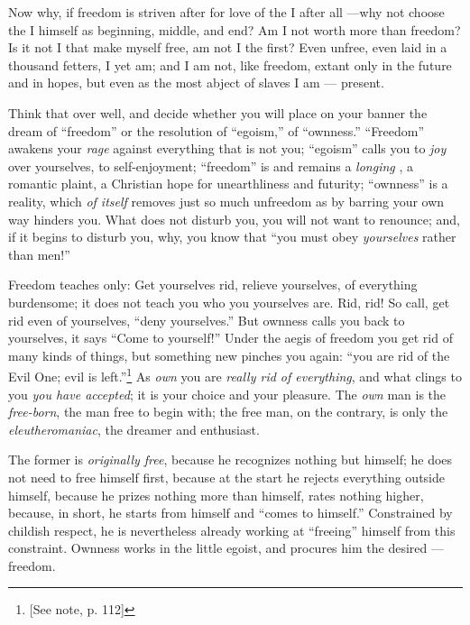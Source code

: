 Now why, if freedom is striven after for love of the I after all ---why not 
choose the I himself as beginning, middle, and end? Am I not worth more than 
freedom? Is it not I that make myself free, am not I the first? Even unfree, 
even laid in a thousand fetters, I yet am; and I am not, like freedom, extant 
only in the future and in hopes, but even as the most abject of slaves I am --- 
present.

Think that over well, and decide whether you will place on your banner the 
dream of ``freedom'' or the resolution of ``egoism,'' of ``ownness.'' 
``Freedom'' awakens your \textit{rage} against everything that is not you; 
``egoism'' calls you to \textit{joy} over yourselves, to self-enjoyment; 
``freedom'' is and remains a \textit{longing} , a romantic plaint, a 
Christian hope for unearthliness and futurity; ``ownness'' is a reality, 
which \textit{of itself} removes just so much unfreedom as by barring your own 
way hinders you. What does not disturb you, you will not want to renounce; 
and, if it begins to disturb you, why, you know that ``you must obey 
\textit{yourselves} rather than men!''

Freedom teaches only: Get yourselves rid, relieve yourselves, of everything 
burdensome; it does not teach you who you yourselves are. Rid, rid! So call, 
get rid even of yourselves, ``deny yourselves.'' But ownness calls you back 
to yourselves, it says ``Come to yourself!'' Under the aegis of freedom you 
get rid of many kinds of things, but something new pinches you again: ``you 
are rid of the Evil One; evil is left.''\footnote{[See note, p. 112]} As 
\textit{own} you are \textit{really rid of everything}, and what clings to you 
\textit{you have accepted}; it is your choice and your pleasure. The 
\textit{own} man is the \textit{free-born}, the man free to begin with; the 
free man, on the contrary, is only the \textit{eleutheromaniac}, the dreamer 
and enthusiast.

The former is \textit{originally free}, because he recognizes nothing but 
himself; he does not need to free himself first, because at the start he 
rejects everything outside himself, because he prizes nothing more than 
himself, rates nothing higher, because, in short, he starts from himself and 
``comes to himself.'' Constrained by childish respect, he is nevertheless 
already working at ``freeing'' himself from this constraint. Ownness works 
in the little egoist, and procures him the desired ---freedom.

